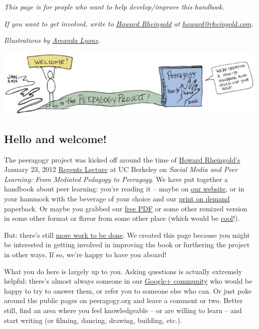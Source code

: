 \emph{This page is for people who want to help develop/improve this
handbook.}

\emph{If you want to get involved, write to
\href{http://en.wikipedia.org/wiki/Howard\_Rheingold}{Howard Rheingold}
at \href{mailto:howard@rheingold.com}{howard@rheingold.com}.}

\emph{Illustrations by \href{http://www.visualsforchange.com/}{Amanda
Lyons}.}

\begin{center}
\includegraphics[width=.9\textwidth]{../pictures/welcome_color.jpg}
\end{center}

\subsection{Hello and welcome!}

The peeragogy project was kicked off around the time of
\href{http://rheingold.com/}{Howard Rheingold's} January 23, 2012
\href{http://vimeo.com/35685124}{Regents Lecture} at UC Berkeley on
\emph{Social Media and Peer Learning: From Mediated Pedagogy to
Peeragogy}. We have put together a handbook about peer learning: you're
reading it -- maybe on \href{peeragogy.org}{our website}, or in your
hammock with the beverage of your choice and our
\href{http://www.lulu.com/shop/howard-rheingold-and-peeragogyorg-editors/the-peeragogy-handbook/paperback/product-20607425.html}{print
on demand} paperback. Or maybe you grabbed our
\href{peeragogy-2.0-ebook.pdf}{free PDF} or
some other remixed version in some other format or flavor from some
other place (which would be
\href{http://peeragogy.org/resources/license/}{cool}!).

But: there's still
\href{http://peeragogy.org/peeragogy-org-roadmap/}{more work to be
done}. We created this page because you might be interested in getting
involved in improving the book or furthering the project in other ways.
If so, we're happy to have you aboard!

What you do here is largely up to you. Asking questions is actually
extremely helpful: there's almost always someone in our
\href{https://plus.google.com/u/0/communities/107386162349686249470}{Google+
community} who would be happy to try to answer them, or refer you to
someone else who can.  Or just poke around the public pages on peeragogy.org and
leave a comment or two. Better still, find an area where you feel
knowledgeable -- or are willing to learn -- and start writing (or
filming, dancing, drawing, building, etc.).

